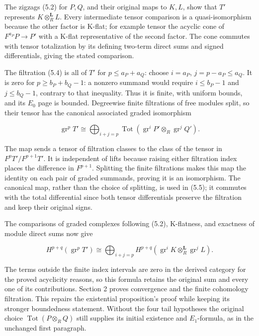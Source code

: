 The zigzags (5.2) for \(P,Q\), and their original maps to \(K,L\), show that \(T'\) represents \(K\otimes_R^{\mathbf L}L\). Every intermediate tensor comparison is a quasi-isomorphism because the other factor is K-flat; for example tensor the acyclic cone of \(F^{a_P}P\to P'\) with a K-flat representative of the second factor. The cone commutes with tensor totalization by its defining two-term direct sums and signed differentials, giving the stated comparison.

The filtration (5.4) is all of \(T'\) for \(p\leq a_P+a_Q\): choose \(i=a_P\), \(j=p-a_P\leq a_Q\). It is zero for \(p\geq b_P+b_Q-1\): a nonzero summand would require \(i\leq b_P-1\) and \(j\leq b_Q-1\), contrary to that inequality. Thus it is finite, with uniform bounds, and its \(E_0\) page is bounded. Degreewise finite filtrations of free modules split, so their tensor has the canonical associated graded isomorphism

\[
\operatorname{gr}^pT'
\cong\bigoplus_{i+j=p}\operatorname{Tot}
  (\operatorname{gr}^iP'\otimes_R\operatorname{gr}^jQ').       \tag{5.5}
\]

The map sends a tensor of filtration classes to the class of the tensor in \(F^pT'/F^{p+1}T'\). It is independent of lifts because raising either filtration index places the difference in \(F^{p+1}\). Splitting the finite filtrations makes this map the identity on each pair of graded summands, proving it is an isomorphism. The canonical map, rather than the choice of splitting, is used in (5.5); it commutes with the total differential since both tensor differentials preserve the filtration and keep their original signs.

The comparisons of graded complexes following (5.2), K-flatness, and exactness of module direct sums now give

\[
H^{p+q}(\operatorname{gr}^pT')
\cong\bigoplus_{i+j=p}
H^{p+q}(\operatorname{gr}^iK\otimes_R^{\mathbf L}\operatorname{gr}^jL).
\]

The terms outside the finite index intervals are zero in the derived category for the proved acyclicity reasons, so this formula retains the original sum and every one of its contributions. Section 2 proves convergence and the finite cohomology filtration. This repairs the existential proposition's proof while keeping its stronger boundedness statement. Without the four tail hypotheses the original choice \(\operatorname{Tot}(P\otimes_R Q)\) still supplies its initial existence and \(E_1\)-formula, as in the unchanged first paragraph.

